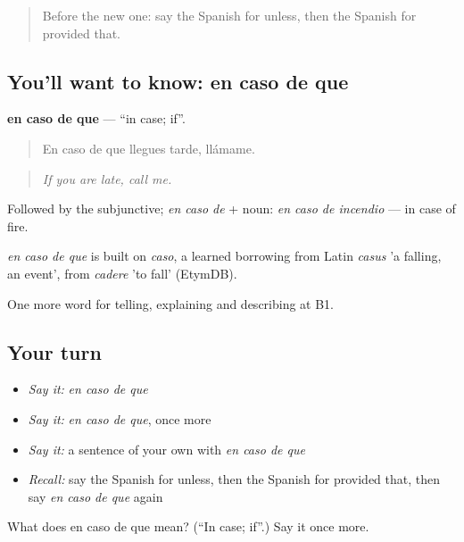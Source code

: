 \label{lesson:ES-C611-en-caso-de-que}



\begin{quote}
Before the new one: say the Spanish for unless, then the Spanish for provided that.
\end{quote}

\subsection*{You'll want to know: en caso de que}
\textbf{en caso de que} — \textquotedblleft{}in case; if\textquotedblright{}.

\begin{quote}
En caso de que llegues tarde, llámame.
\end{quote}

\begin{quote}
\emph{If you are late, call me.}
\end{quote}

Followed by the subjunctive; \emph{en caso de} + noun: \emph{en caso de incendio} — in case of fire.

\begin{cousinweb}
\emph{en caso de que} is built on \emph{caso}, a learned borrowing from Latin \emph{casus} 'a falling, an event', from \emph{cadere} 'to fall' (EtymDB).
\end{cousinweb}

\begin{grammarlens}[title={What you've built}]
One more word for telling, explaining and describing at B1.
\end{grammarlens}

\subsection*{Your turn}
\begin{itemize}
\raggedright
  \item \emph{Say it:} \emph{en caso de que}
  \item \emph{Say it:} \emph{en caso de que}, once more
  \item \emph{Say it:} a sentence of your own with \emph{en caso de que}
  \item \emph{Recall:} say the Spanish for unless, then the Spanish for provided that, then say \emph{en caso de que} again
\end{itemize}

\begin{tcolorbox}[breakable,colback=teal!4,colframe=teal!35!black,title={Before you move on}]
What does en caso de que mean? (\textquotedblleft{}In case; if\textquotedblright{}.) Say it once more.
\end{tcolorbox}
